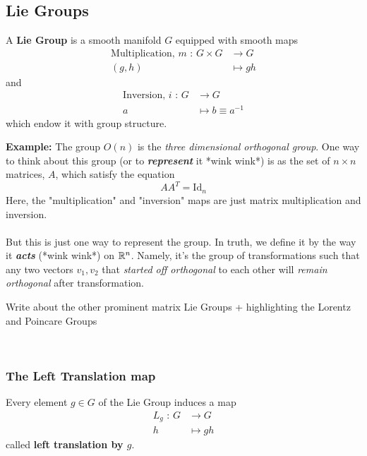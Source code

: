 \documentclass[11pt]{article}
\begin{document}
\subsection{Lie Groups}
\begin{bluebox}
  \begin{definition}
    A \textbf{Lie Group} is a smooth manifold $G$ equipped with smooth maps
    \begin{align*}
      \text{Multiplication, } m \text{ : } G \times G &\rightarrow G \\ 
      (g, h) &\mapsto gh 
    \end{align*} and 
    \begin{align*}
      \text{Inversion, } i \text{ : } G &\rightarrow G \\ 
      a &\mapsto  b \equiv a^{-1}
    \end{align*}
    which endow it with group structure.
  \end{definition}
\end{bluebox}
\vskip 0.5cm
\textbf{Example:} The group $O(n)$ is the \textit{three dimensional orthogonal group}. One way to think about this group (or to \emph{\textbf{represent}} it *wink wink*) is as the set of $n \times n$ matrices, $A$, which satisfy the equation \[A A^{T} = \mathrm{Id}_n\]Here, the "multiplication" and "inversion" maps are just matrix multiplication and inversion.
\\
\\
But this is just one way to represent the group. In truth, we define it by the way it \emph{\textbf{acts}} (*wink wink*) on $\mathbb{R}^n$. Namely, it's the group of transformations such that any two vectors $v_1, v_2$ that \emph{started off orthogonal} to each other will \emph{remain orthogonal} after transformation.
\\
\begin{note}
  {Write about the other prominent matrix Lie Groups + highlighting the Lorentz and Poincare Groups}
\end{note}
\\
\subsubsection{The Left Translation map}
\begin{bluebox}
  \begin{definition}
    Every element $g \in G$ of the Lie Group induces a map 
\begin{align*}
  L_g \text{ : } G &\rightarrow G \\
                 h &\mapsto gh
\end{align*}
called \textbf{left translation by $g$}.
  \end{definition}
\end{bluebox}
\end{document}
